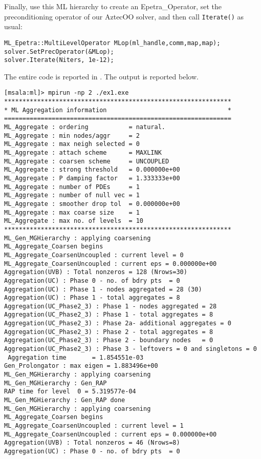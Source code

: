 Finally, use this ML hierarchy to create an Epetra\_Operator, 
set the preconditioning operator of our AztecOO solver,
and then call \verb!Iterate()! as usual:
\begin{verbatim}
ML_Epetra::MultiLevelOperator MLop(ml_handle,comm,map,map);
solver.SetPrecOperator(&MLop);
solver.Iterate(Niters, 1e-12);
\end{verbatim}
The entire code is reported in 
\newline
{}. 
The output is reported below.
\begin{verbatim}
[msala:ml]> mpirun -np 2 ./ex1.exe
**************************************************************
* ML Aggregation information                                 *
==============================================================
ML_Aggregate : ordering           = natural.
ML_Aggregate : min nodes/aggr     = 2
ML_Aggregate : max neigh selected = 0
ML_Aggregate : attach scheme      = MAXLINK
ML_Aggregate : coarsen scheme     = UNCOUPLED
ML_Aggregate : strong threshold   = 0.000000e+00
ML_Aggregate : P damping factor   = 1.333333e+00
ML_Aggregate : number of PDEs     = 1
ML_Aggregate : number of null vec = 1
ML_Aggregate : smoother drop tol  = 0.000000e+00
ML_Aggregate : max coarse size    = 1
ML_Aggregate : max no. of levels  = 10
**************************************************************
ML_Gen_MGHierarchy : applying coarsening
ML_Aggregate_Coarsen begins
ML_Aggregate_CoarsenUncoupled : current level = 0
ML_Aggregate_CoarsenUncoupled : current eps = 0.000000e+00
Aggregation(UVB) : Total nonzeros = 128 (Nrows=30)
Aggregation(UC) : Phase 0 - no. of bdry pts  = 0
Aggregation(UC) : Phase 1 - nodes aggregated = 28 (30)
Aggregation(UC) : Phase 1 - total aggregates = 8
Aggregation(UC_Phase2_3) : Phase 1 - nodes aggregated = 28
Aggregation(UC_Phase2_3) : Phase 1 - total aggregates = 8
Aggregation(UC_Phase2_3) : Phase 2a- additional aggregates = 0
Aggregation(UC_Phase2_3) : Phase 2 - total aggregates = 8
Aggregation(UC_Phase2_3) : Phase 2 - boundary nodes   = 0
Aggregation(UC_Phase2_3) : Phase 3 - leftovers = 0 and singletons = 0
 Aggregation time       = 1.854551e-03
Gen_Prolongator : max eigen = 1.883496e+00
ML_Gen_MGHierarchy : applying coarsening
ML_Gen_MGHierarchy : Gen_RAP
RAP time for level  0 = 5.319577e-04
ML_Gen_MGHierarchy : Gen_RAP done
ML_Gen_MGHierarchy : applying coarsening
ML_Aggregate_Coarsen begins
ML_Aggregate_CoarsenUncoupled : current level = 1
ML_Aggregate_CoarsenUncoupled : current eps = 0.000000e+00
Aggregation(UVB) : Total nonzeros = 46 (Nrows=8)
Aggregation(UC) : Phase 0 - no. of bdry pts  = 0

\end{verbatim}
